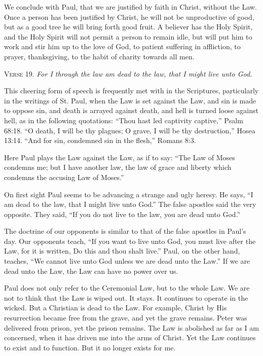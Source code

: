 We conclude with Paul, that we are justified by faith in Christ, without the Law. Once a person has been justified by Christ, he will not be unproductive of good, but as a good tree he will bring forth good fruit. A believer has the Holy Spirit, and the Holy Spirit will not permit a person to remain idle, but will put him to work and stir him up to the love of God, to patient suffering in affliction, to prayer, thanksgiving, to the habit of charity towards all men.

\textsc{Verse} 19. \emph{For I through the law am dead to the law, that I might live unto God.}

This cheering form of speech is frequently met with in the Scriptures, particularly in the writings of St. Paul, when the Law is set against the Law, and sin is made to oppose sin, and death is arrayed against death, and hell is turned loose against hell, as in the following quotations: “Thou hast led captivity captive,” Psalm 68:18. “O death, I will be thy plagues; O grave, I will be thy destruction,” Hosea 13:14. “And for sin, condemned sin in the flesh,” Romans 8:3.

Here Paul plays the Law against the Law, as if to say: “The Law of Moses condemns me; but I have another law, the law of grace and liberty which condemns the accusing Law of Moses.”

On first sight Paul seems to be advancing a strange and ugly heresy. He says, “I am dead to the law, that I might live unto God.” The false apostles said the very opposite. They said, “If you do not live to the law, you are dead unto God.”

The doctrine of our opponents is similar to that of the false apostles in Paul’s day. Our opponents teach, “If you want to live unto God, you must live after the Law, for it is written, Do this and thou shalt live.” Paul, on the other hand, teaches, “We cannot live unto God unless we are dead unto the Law.” If we are dead unto the Law, the Law can have no power over us.

Paul does not only refer to the Ceremonial Law, but to the whole Law. We are not to think that the Law is wiped out. It stays. It continues to operate in the wicked. But a Christian is dead to the Law. For example, Christ by His resurrection became free from the grave, and yet the grave remains. Peter was delivered from prison, yet the prison remains. The Law is abolished as far as I am concerned, when it has driven me into the arms of Christ. Yet the Law continues to exist and to function. But it no longer exists for me.

